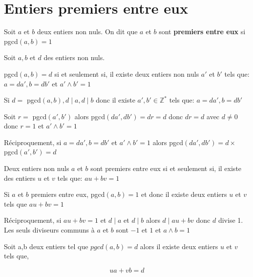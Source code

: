 \documentclass[french]{book}
\begin{document}
\section{Entiers premiers entre eux}


\begin{defn}

Soit $a$ et $b$ deux entiers non nuls. On dit que $a$ et $b$ sont \textbf{premiers entre eux} si pgcd$(a,b)=1$

\end{defn} 
 
\begin{thm}

Soit $a,b$ et $d$ des entiers non nuls. 

pgcd$(a,b)=d$ si et seulement si, il existe deux entiers non nuls $a'$ et $b'$ tels que: $a=da',b=db'$ et $a'\wedge b'=1$
 
\end{thm}

\begin{demo}

  Si $d=$ pgcd$(a,b), d\mid a, d\mid b$ donc il existe $a', b' \in \mathbb{Z}^{*}$ tels que: $a=da', b=db'$
  
  Soit $r=$ pgcd$(a',b')$ alors pgcd$(da',db')=dr=d$ donc $dr=d$ avec $d\neq 0$ donc $r=1$ et $a'\wedge b'=1$
  
  Réciproquement, si $a=da', b=db'$ et $a'\wedge b'=1$ alors pgcd$(da',db')=d \times$pgcd$(a',b')=d$
 
\end{demo}


\begin{thm}

Deux entiers non nuls $a$ et $b$ sont premiers entre eux si et seulement si, il existe des entiers $u$ et $v$ tels que: $au+bv=1$
\end{thm}

\begin{demo}

Si $a$ et $b$ premiers entre eux, pgcd$(a,b)=1$ et donc il existe deux entiers $u$ et $v$ tels que $au+bv=1$

Réciproquement, si $au+bv=1$ et $d\mid a$ et $d\mid b$ alors $d\mid au+bv$ donc $d$ divise 1. Les seuls diviseurs communs à $a$ et $b$ sont $-1$ et $1$ et $a \wedge b=1$

\end{demo}

\begin{cor}
Soit a,b deux entiers tel que $pgcd(a,b)=d$ alors il existe deux entiers $u$ et $v$ tels que,

 $$ua+vb=d$$
\end{cor}
\end{document}
